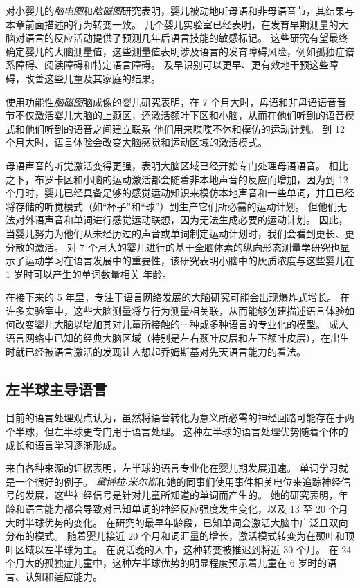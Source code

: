 对小婴儿的\textit{脑电图}和\textit{脑磁图}研究表明，婴儿被动地听母语和非母语音节，其结果与本章前面描述的行为转变一致。
几个婴儿实验室已经表明，在发育早期测量的大脑对语言的反应活动提供了预测几年后语言技能的敏感标记。
这些研究有望最终确定婴儿的大脑测量值，这些测量值表明涉及语言的发育障碍风险，例如孤独症谱系障碍、阅读障碍和特定语言障碍。
及早识别可以更早、更有效地干预这些障碍，改善这些儿童及其家庭的结果。


使用功能性\textit{脑磁图}脑成像的婴儿研究表明，在 7 个月大时，母语和非母语语音音节不仅激活婴儿大脑的上颞区，还激活额叶下区和小脑，从而在他们听到的语音模式和他们听到的语音之间建立联系 他们用来喋喋不休和模仿的运动计划。
到 12 个月大时，语言体验会改变大脑感觉和运动区域的激活模式。


母语声音的听觉激活变得更强，表明大脑区域已经开始专门处理母语语音。
相比之下，布罗卡区和小脑的运动激活都会随着非本地声音的反应而增加，因为到 12 个月时，婴儿已经具备足够的感觉运动知识来模仿本地声音和一些单词，并且已经将存储的听觉模式（如“杯子”和“球”）到生产它们所必需的运动计划。
但他们无法对外语声音和单词进行感觉运动联想，因为无法生成必要的运动计划。
因此，当婴儿努力为他们从未经历过的声音或单词制定运动计划时，我们会看到更长、更分散的激活。
对 7 个月大的婴儿进行的基于全脑体素的纵向形态测量学研究也显示了运动学习在语言发展中的重要性，该研究表明小脑中的灰质浓度与这些婴儿在 1 岁时可以产生的单词数量相关 年龄。


在接下来的 5 年里，专注于语言网络发展的大脑研究可能会出现爆炸式增长。
在许多实验室中，这些大脑测量将与行为测量相关联，从而能够创建描述语言体验如何改变婴儿大脑以增加其对儿童所接触的一种或多种语言的专业化的模型。
成人语言网络中已知的经典大脑区域（特别是左右颞叶皮层和左下额叶皮层），在出生时就已经被语言激活的发现让人想起乔姆斯基对先天语言能力的看法。



\subsection{左半球主导语言}

目前的语言处理观点认为，虽然将语音转化为意义所必需的神经回路可能存在于两个半球，但左半球更专门用于语言处理。
这种左半球的语言处理优势随着个体的成长和语言学习逐渐形成。


来自各种来源的证据表明，左半球的语言专业化在婴儿期发展迅速。
单词学习就是一个很好的例子。
\textit{黛博拉$\cdot$米尔斯}和她的同事们使用事件相关电位来追踪神经信号的发展，这些神经信号是针对儿童所知道的单词而产生的。
她的研究表明，年龄和语言能力都会导致对已知单词的神经反应强度发生变化，以及 13 至 20 个月大时半球优势的变化。
在研究的最早年龄段，已知单词会激活大脑中广泛且双向分布的模式。
随着婴儿接近 20 个月和词汇量的增长，激活模式转变为在颞叶和顶叶区域以左半球为主。
在说话晚的人中，这种转变被推迟到将近 30 个月。
在 24 个月大的孤独症儿童中，这种左半球优势的明显程度预示着儿童在 6 岁时的语言、认知和适应能力。



